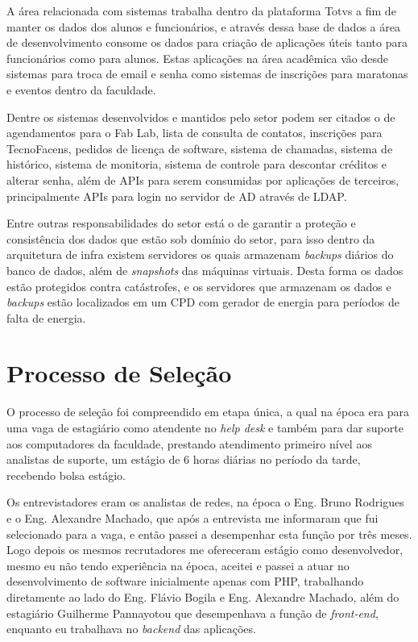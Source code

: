 \documentclass[
	12pt,				%
	oneside,			%
	a4paper,			%
	chapter=TITLE,		%
	section=TITLE,		%
	sumario=tradicional %
	english,			%
	french,				%
	spanish,			%
	brazil				%
	]{abntex2}
\begin{document}
A área relacionada com sistemas trabalha dentro da plataforma Totvs a fim de manter os dados dos alunos e funcionários, e através dessa base de dados a área de desenvolvimento consome os dados para criação de aplicações úteis tanto para funcionários como para alunos. Estas aplicações na área acadêmica vão desde sistemas para troca de email e senha como sistemas de inscrições para maratonas   e eventos dentro da faculdade.

Dentre os sistemas desenvolvidos e mantidos pelo setor podem ser citados o de agendamentos para o Fab Lab, lista de consulta de contatos, inscrições para TecnoFacens, pedidos de licença de software, sistema de chamadas, sistema de histórico, sistema de monitoria, sistema de controle para descontar créditos e alterar senha, além de APIs para serem consumidas por aplicações de terceiros, principalmente APIs para login no servidor de AD através de LDAP.

Entre outras responsabilidades do setor está o de garantir a proteção e consistência dos dados que estão sob domínio do setor, para isso dentro da arquitetura de infra existem servidores os quais armazenam \textit{backups} diários do banco de dados, além de \textit{snapshots} das máquinas virtuais. Desta forma os dados estão protegidos contra catástrofes, e os servidores que armazenam os dados e \textit{backups} estão localizados em um CPD com gerador de energia para períodos de falta de energia.

\section{Processo de Seleção}
\label{sec:procselecao}
O processo de seleção foi compreendido em etapa única, a qual na época era para uma vaga de estagiário como atendente no \textit{help desk} e também para dar suporte aos computadores da faculdade, prestando atendimento primeiro nível aos analistas de suporte, um estágio de 6 horas diárias no período da tarde, recebendo bolsa estágio. 

Os entrevistadores eram os analistas de redes, na época o Eng. Bruno Rodrigues e o Eng. Alexandre Machado, que após a entrevista me informaram que fui selecionado para a vaga, e então passei a desempenhar esta função por três meses. Logo depois os mesmos recrutadores me ofereceram estágio como desenvolvedor, mesmo eu não tendo experiência na época, aceitei e passei a atuar no desenvolvimento de software inicialmente apenas com PHP, trabalhando diretamente ao lado do Eng. Flávio Bogila e Eng. Alexandre Machado, além do estagiário Guilherme Pannayotou que desempenhava a função de \textit{front-end}, enquanto eu trabalhava no \textit{backend} das aplicações.
\end{document}
